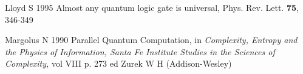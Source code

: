 \documentclass{article}
\begin{document}
\begin{thebibliography}{12}
Lloyd S 1995
Almost any quantum logic gate is universal,
Phys. Rev. Lett. {\bf 75}, 346-349

% 
% 
% 
% 
% 
% 
% 
% 
% 
% 

Margolus N 1990 
Parallel Quantum Computation,
in {\em Complexity, Entropy and the Physics of
Information, Santa Fe Institute Studies in the Sciences
of Complexity,} vol VIII p. 273
ed Zurek W H (Addison-Wesley)














% 


\end{thebibliography}
\end{document}
